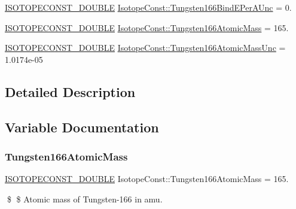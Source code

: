 \begin{DoxyCompactItemize}
\mbox{\hyperlink{group___isotope_const-_macros_ga8f45a7272ce02c0b4c65c44636ed719a}{I\+S\+O\+T\+O\+P\+E\+C\+O\+N\+S\+T\+\_\+\+D\+O\+U\+B\+LE}} \mbox{\hyperlink{group___isotope_const-_tungsten-_w166_ga981bd586bfbe63924599170b11670fd0}{Isotope\+Const\+::\+Tungsten166\+Bind\+E\+Per\+A\+Unc}} = 0.
\item 
\mbox{\hyperlink{group___isotope_const-_macros_ga8f45a7272ce02c0b4c65c44636ed719a}{I\+S\+O\+T\+O\+P\+E\+C\+O\+N\+S\+T\+\_\+\+D\+O\+U\+B\+LE}} \mbox{\hyperlink{group___isotope_const-_tungsten-_w166_gac782bef6d761135e389230ac1a2e3463}{Isotope\+Const\+::\+Tungsten166\+Atomic\+Mass}} = 165.
\item 
\mbox{\hyperlink{group___isotope_const-_macros_ga8f45a7272ce02c0b4c65c44636ed719a}{I\+S\+O\+T\+O\+P\+E\+C\+O\+N\+S\+T\+\_\+\+D\+O\+U\+B\+LE}} \mbox{\hyperlink{group___isotope_const-_tungsten-_w166_gac43206e559a5f5b6d58356850cc6b7f4}{Isotope\+Const\+::\+Tungsten166\+Atomic\+Mass\+Unc}} = 1.\+0174e-\/05
\end{DoxyCompactItemize}


\subsection{Detailed Description}


\subsection{Variable Documentation}
\mbox{\label{group___isotope_const-_tungsten-_w166_gac782bef6d761135e389230ac1a2e3463}} 
\subsubsection{\texorpdfstring{Tungsten166\+Atomic\+Mass}{Tungsten166AtomicMass}}
{\footnotesize\ttfamily \mbox{\hyperlink{group___isotope_const-_macros_ga8f45a7272ce02c0b4c65c44636ed719a}{I\+S\+O\+T\+O\+P\+E\+C\+O\+N\+S\+T\+\_\+\+D\+O\+U\+B\+LE}} Isotope\+Const\+::\+Tungsten166\+Atomic\+Mass = 165.}

\$ \$ Atomic mass of Tungsten-\/166 in amu. \mbox{\label{group___isotope_const-_tungsten-_w166_gac43206e559a5f5b6d58356850cc6b7f4}} 
